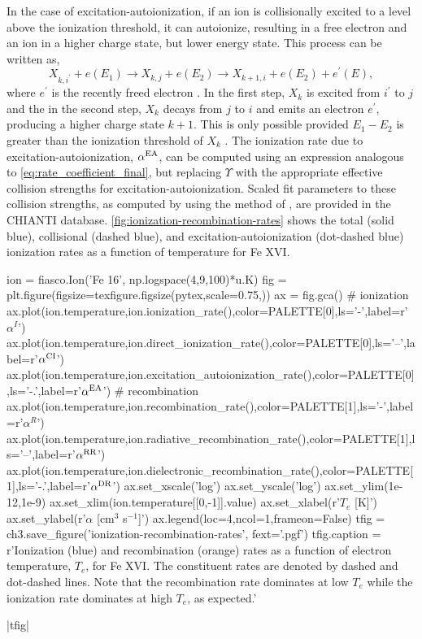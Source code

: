 In the case of excitation-autoionization, if an ion is collisionally excited to a level above the ionization threshold, it can autoionize, resulting in a free electron and an ion in a higher charge state, but lower energy state. This process can be written as,
\begin{equation}\label{eq:excitation_autoionization}
    X_{k,i^\prime} + e(E_1) \to X_{k,j} + e(E_2) \to X_{k+1,i} + e(E_2) + e^\prime(E),
\end{equation}
where $e^\prime$ is the recently freed electron \citep{phillips_ultraviolet_2008}. In the first step, $X_k$ is excited from $i^\prime$ to $j$ and the in the second step, $X_k$ decays from $j$ to $i$ and emits an electron $e^\prime$, producing a higher charge state $k+1$. This is only possible provided $E_1 - E_2$ is greater than the ionization threshold of $X_k$ \citep{bradshaw_collisional_2013}. The ionization rate due to excitation-autoionization, $\alpha^\textup{EA}$, can be computed using an expression analogous to \autoref{eq:rate_coefficient_final}, but replacing $\Upsilon$ with the appropriate effective collision strengths for excitation-autoionization. Scaled fit parameters to these collision strengths, as computed by \citet{dere_ionization_2007} using the method of \citet{burgess_analysis_1992}, are provided in the CHIANTI database. \autoref{fig:ionization-recombination-rates} shows the total (solid blue), collisional (dashed blue), and excitation-autoionization (dot-dashed blue) ionization rates as a function of temperature for Fe XVI.   

\begin{pycode}[chapter3]
ion = fiasco.Ion('Fe 16', np.logspace(4,9,100)*u.K)
fig = plt.figure(figsize=texfigure.figsize(pytex,scale=0.75,))
ax = fig.gca()
# ionization
ax.plot(ion.temperature,ion.ionization_rate(),color=PALETTE[0],ls='-',label=r'$\alpha^I$')
ax.plot(ion.temperature,ion.direct_ionization_rate(),color=PALETTE[0],ls='--',label=r'$\alpha^\textup{CI}$')
ax.plot(ion.temperature,ion.excitation_autoionization_rate(),color=PALETTE[0],ls='-.',label=r'$\alpha^\textup{EA}$')
# recombination
ax.plot(ion.temperature,ion.recombination_rate(),color=PALETTE[1],ls='-',label=r'$\alpha^R$')
ax.plot(ion.temperature,ion.radiative_recombination_rate(),color=PALETTE[1],ls='--',label=r'$\alpha^\textup{RR}$')
ax.plot(ion.temperature,ion.dielectronic_recombination_rate(),color=PALETTE[1],ls='-.',label=r'$\alpha^\textup{DR}$')
ax.set_xscale('log')
ax.set_yscale('log')
ax.set_ylim(1e-12,1e-9)
ax.set_xlim(ion.temperature[[0,-1]].value)
ax.set_xlabel(r'$T_e$ [K]')
ax.set_ylabel(r'$\alpha$ [cm$^3$ s$^{-1}$]')
ax.legend(loc=4,ncol=1,frameon=False)
tfig = ch3.save_figure('ionization-recombination-rates', fext='.pgf')
tfig.caption = r'Ionization (blue) and recombination (orange) rates as a function of electron temperature, $T_e$, for Fe XVI. The constituent rates are denoted by dashed and dot-dashed lines. Note that the recombination rate dominates at low $T_e$ while the ionization rate dominates at high $T_e$, as expected.'
\end{pycode}
\py[chapter3]|tfig|

